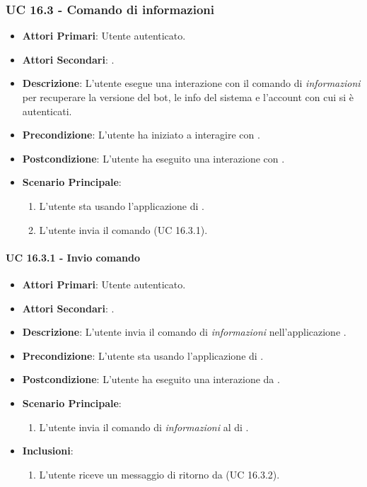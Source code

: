 	\subsubsection{UC 16.3 - Comando di informazioni}
	\begin{itemize}
		\item \textbf{Attori Primari}: Utente autenticato.
		\item \textbf{Attori Secondari}: .
		\item \textbf{Descrizione}: L'utente esegue una interazione con il comando di \textit{informazioni} per recuperare la versione del bot, le info del sistema e l'account con cui si è autenticati.
		\item \textbf{Precondizione}: L'utente ha iniziato a interagire con .
		\item \textbf{Postcondizione}: L'utente ha eseguito una interazione con .
		\item \textbf{Scenario Principale}:
		\begin{enumerate}
			\item L'utente sta usando l'applicazione di . 
			\item L'utente invia il comando (UC 16.3.1).
		\end{enumerate}
	\end{itemize}

		\paragraph{UC 16.3.1 - Invio comando}
		\begin{itemize}
			\item \textbf{Attori Primari}: Utente autenticato.
			\item \textbf{Attori Secondari}: .
			\item \textbf{Descrizione}: L'utente invia il comando di \textit{informazioni} nell'applicazione .
			\item \textbf{Precondizione}: L'utente sta usando l'applicazione di .
			\item \textbf{Postcondizione}: L'utente ha eseguito una interazione da .
			\item \textbf{Scenario Principale}:
			\begin{enumerate}
				\item L'utente invia il comando di \textit{informazioni} al  di .
			\end{enumerate}
			\item \textbf{Inclusioni}:
			\begin{enumerate}
				\item L'utente riceve un messaggio di ritorno da  (UC 16.3.2).
			\end{enumerate}
		\end{itemize}

